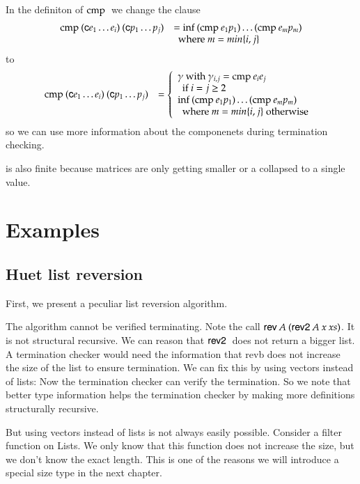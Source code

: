 In the definiton of $\mathrm{cmp}\:$ we change the clause 
\[
\begin{array}[t]{ll}
\mathrm{cmp}\: (\mathsf{c} e_1 \ldots e_i) \: (\mathsf{c} p_1 \ldots p_j ) & = \mathrm{inf}\: (\mathrm{cmp}\: e_1 p_1) \ldots (\mathrm{cmp}\: e_m p_m)\\
& \: \mbox { where } m = min\{i,j\}\\ 
\end{array}
\]
to
\[
\begin{array}[t]{ll}
\mathrm{cmp}\: (\mathsf{c} e_1 \ldots e_i) \: (\mathsf{c} p_1 \ldots p_j ) & = 
\left\{\begin{array}{l} \gamma \mbox{ with } \gamma_{i,j} = \mathrm{cmp}\: e_i e_j \\
\: \mbox{ if } i = j \geq 2 \\
\mathrm{inf}\: (\mathrm{cmp}\: e_1 p_1) \ldots (\mathrm{cmp}\: e_m p_m)\\
\: \mbox { where } m = min\{i,j\} \mbox{ otherwise } 
\end{array}
\right.
\end{array}
\]
so we can use more information about the componenets during termination checking.

\begin{definition}
is also finite because matrices are only getting smaller or a collapsed to a single value.
\end{definition}

\section{Examples}


\subsection{Huet list reversion}
First, we present a peculiar list reversion algorithm.

The algorithm cannot be verified terminating.
Note the call $\mathsf{rev}\: A \: (\mathsf{rev2}\: A \: x \: xs)$.
It is not structural recursive.
We can reason that $\mathsf{rev2}\:$ does not return a bigger list.  
A termination checker would need the information that revb does not increase the size of the list to ensure termination.
We can fix this by using vectors instead of lists:
Now the termination checker can verify the termination.
So we note that better type information helps the termination checker by making more definitions structurally recursive.

But using vectors instead of lists is not always easily possible.
Consider a filter function on Lists. We only know that this function does not increase the size, but
we don't know the exact length.
This is one of the reasons we will introduce a special size type in the next chapter.

